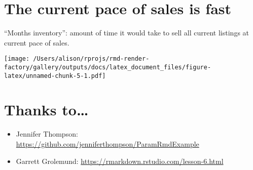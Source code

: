 \documentclass[]{article}
\newenvironment{Shaded}{\begin{snugshade}}{\end{snugshade}}
\newcommand{\CharTok}[1]{\textcolor[rgb]{0.31,0.60,0.02}{#1}}
\newcommand{\DataTypeTok}[1]{\textcolor[rgb]{0.13,0.29,0.53}{#1}}
\newcommand{\KeywordTok}[1]{\textcolor[rgb]{0.13,0.29,0.53}{\textbf{#1}}}
\newcommand{\NormalTok}[1]{#1}
\newcommand{\OperatorTok}[1]{\textcolor[rgb]{0.81,0.36,0.00}{\textbf{#1}}}
\newcommand{\OtherTok}[1]{\textcolor[rgb]{0.56,0.35,0.01}{#1}}
\newcommand{\StringTok}[1]{\textcolor[rgb]{0.31,0.60,0.02}{#1}}
\providecommand{\tightlist}{%
  \setlength{\itemsep}{0pt}\setlength{\parskip}{0pt}}
\begin{document}
\hypertarget{the-current-pace-of-sales-is-fast}{%
\section{The current pace of sales is
fast}\label{the-current-pace-of-sales-is-fast}}

``Months inventory'': amount of time it would take to sell all current
listings at current pace of sales.

\begin{Shaded}
\end{Shaded}

\texttt{[image: /Users/alison/rprojs/rmd-render-factory/gallery/outputs/docs/latex\_document\_files/figure-latex/unnamed-chunk-5-1.pdf]}

\hypertarget{thanks-to}{%
\section{Thanks to\ldots{}}\label{thanks-to}}

\begin{itemize}
\tightlist
\item
  Jennifer Thompson:
  \url{https://github.com/jenniferthompson/ParamRmdExample}
\item
  Garrett Grolemund: \url{https://rmarkdown.rstudio.com/lesson-6.html}
\end{itemize}
\end{document}
